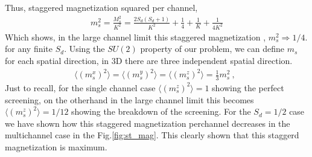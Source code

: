 \documentclass[reprint,prb,superscriptaddress]{revtex4-2}
\begin{document}
\noindent Thus, staggered magnetization squared per channel,
\begin{eqnarray}
m_s^2=\frac{M_s^2}{K^2}= \frac{2S_d(S_d+1)}{K^2}+\frac{1}{4}+\frac{1}{K}+\frac{1}{4K^2}
\end{eqnarray}
Which shows, in the large channel limit this staggered magnetization , $m^2_s\Rightarrow 1/4.$ for any finite $S_d$.
Using the $SU(2)$ property of our problem, we can define $m_s$ for each spatial direction, in 3D there are three independent spatial direction.
\begin{eqnarray}
\langle(m_s^x)^2\rangle=\langle(m_s^y)^2\rangle=\langle(m_s^z)^2\rangle=\frac{1}{3}m_s^2~,~~   
\end{eqnarray}
Just to recall, for the single channel case $\langle (m_s^z)^2 \rangle =1$ showing the perfect screening, on the otherhand in the large channel limit this becomes $\langle (m_s^z)^2 \rangle =1/12$ showing the breakdown of the screening. For the $S_d=1/2$ case we have shown how this staggered magnetization perchannel decreases in the multichannel case in the Fig.\ref{fig:st_mag}. This clearly shown that this staggerd magnetization is maximum.


%
%
%
%
%
\end{document}
